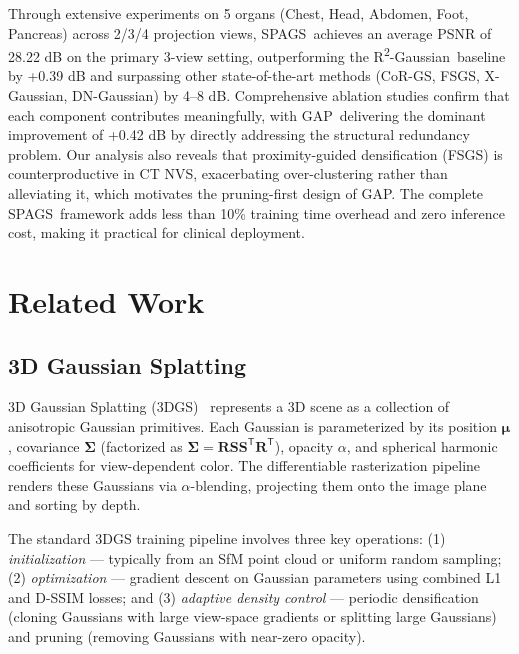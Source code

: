 \documentclass{egPublStyle}
\newcommand{\spags}{SPAGS}
\newcommand{\gap}{GAP}
\newcommand{\rtwo}{R\textsuperscript{2}-Gaussian}
\begin{document}
Through extensive experiments on 5 organs (Chest, Head, Abdomen, Foot, Pancreas) across 2/3/4 projection views, \spags\ achieves an average PSNR of 28.22 dB on the primary 3-view setting, outperforming the \rtwo\ baseline by +0.39 dB and surpassing other state-of-the-art methods (CoR-GS, FSGS, X-Gaussian, DN-Gaussian) by 4--8 dB. Comprehensive ablation studies confirm that each component contributes meaningfully, with \gap\ delivering the dominant improvement of +0.42 dB by directly addressing the structural redundancy problem. Our analysis also reveals that proximity-guided densification (FSGS) is counterproductive in CT NVS, exacerbating over-clustering rather than alleviating it, which motivates the pruning-first design of \gap. The complete \spags\ framework adds less than 10\% training time overhead and zero inference cost, making it practical for clinical deployment.

\section{Related Work}
\label{sec:related}

\subsection{3D Gaussian Splatting}
3D Gaussian Splatting (3DGS)~\cite{kerbl20233d} represents a 3D scene as a collection of anisotropic Gaussian primitives. Each Gaussian is parameterized by its position $\boldsymbol{\mu}$, covariance $\boldsymbol{\Sigma}$ (factorized as $\boldsymbol{\Sigma} = \mathbf{R}\mathbf{S}\mathbf{S}^{\mathsf{T}}\mathbf{R}^{\mathsf{T}}$), opacity $\alpha$, and spherical harmonic coefficients for view-dependent color. The differentiable rasterization pipeline renders these Gaussians via $\alpha$-blending, projecting them onto the image plane and sorting by depth.

The standard 3DGS training pipeline involves three key operations: (1) \textit{initialization} --- typically from an SfM point cloud or uniform random sampling; (2) \textit{optimization} --- gradient descent on Gaussian parameters using combined L1 and D-SSIM losses; and (3) \textit{adaptive density control} --- periodic densification (cloning Gaussians with large view-space gradients or splitting large Gaussians) and pruning (removing Gaussians with near-zero opacity).
\end{document}
